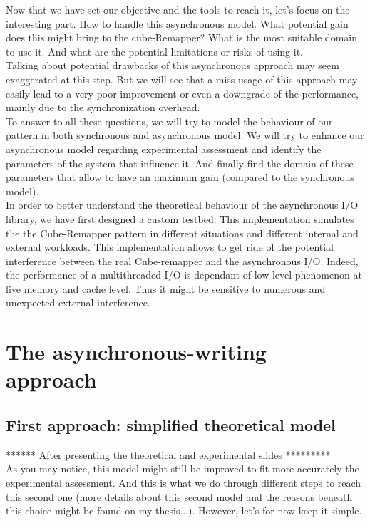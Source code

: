 \documentclass[12pt]{article}											%
\begin{document}
	Now that we have set our objective and the tools to reach it, let's focus on the interesting part.   How to handle this asynchronous model.   What potential gain does this might bring to the cube-Remapper?   What is the most suitable domain to use it.   And what are the potential limitations or risks of using it.\\
	Talking about potential drawbacks of this asynchronous approach may seem exaggerated at this step.   But we will see that a miss-usage of this approach may easily lead to a very poor improvement or even a downgrade of the performance, mainly due to the synchronization overhead.\\


	To answer to all these questions, we will try to model the behaviour of our pattern in both synchronous and asynchronous model.   We will try to enhance our asynchronous model regarding experimental assessment and identify the parameters of the system that influence it.   And finally find the domain of these parameters that allow to have an maximum gain (compared to the synchronous model).\\
	In order to better understand the theoretical behaviour of the asynchronous I/O library, we have first designed a custom testbed.    This implementation simulates the the Cube-Remapper pattern in different situations and different internal and external workloads.   This implementation allows to get ride of the potential interference between the real Cube-remapper and the asynchronous I/O.   Indeed, the performance of a multithreaded I/O is dependant of low level phenomenon at live memory and cache level.   Thus it might be sensitive to numerous and unexpected external interference.\\


\section{The asynchronous-writing approach}
	\subsection{First approach: simplified theoretical model}
		
		****** After presenting the theoretical and experimental slides *********\\
		As you may notice, this model might still be improved to fit more accurately the experimental assessment.   And this is what we do through different steps to reach this second one (more details about this second model and the reasons beneath this choice might be found on my thesis...).   However, let's for now keep it simple.
\end{document}
